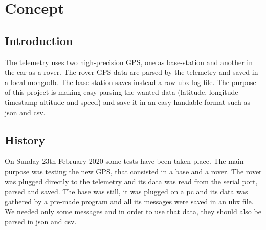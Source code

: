 \section{\huge{Concept}}

\subsection{Introduction}

The telemetry uses two high-precision GPS, one as base-station and another in the car as a rover. 
The rover GPS data are parsed by the telemetry and saved in a local mongodb. 
The base-station saves instead a raw ubx log file. 
The purpose of this project is making easy parsing the wanted data 
(latitude, longitude timestamp altitude and speed) and save it in an easy-handable format such as json and csv.

\subsection{History}
On Sunday 23th February 2020 some tests have been taken place. The main purpose was testing the new GPS, that consisted in
a base and a rover. The rover was plugged directly to the telemetry and its data was read from the serial port, parsed
and saved. The base was still, it was plugged on a pc and its data was gathered by a pre-made program and all its 
messages were saved in an ubx file. We needed only some messages and in order to use that data, they should also 
be parsed in json and csv.